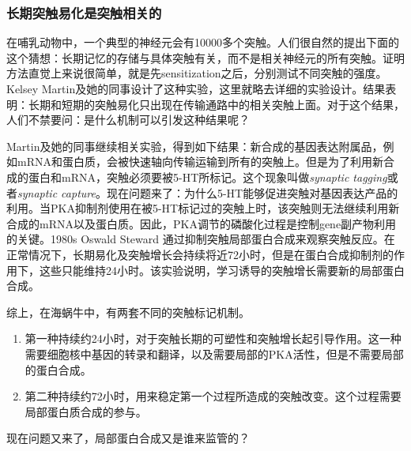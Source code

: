 \documentclass[UTF8,nofonts]{ctexart}
\begin{document}
\subsubsection{长期突触易化是突触相关的}
在哺乳动物中，一个典型的神经元会有10000多个突触。人们很自然的提出下面的这个猜想：长期记忆的存储与具体突触有关，而不是相关神经元的所有突触。证明方法直觉上来说很简单，就是先sensitization之后，分别测试不同突触的强度。Kelsey Martin及她的同事设计了这种实验，这里就略去详细的实验设计。结果表明：长期和短期的突触易化只出现在传输通路中的相关突触上面。对于这个结果，人们不禁要问：是什么机制可以引发这种结果呢？
\par
Martin及她的同事继续相关实验，得到如下结果：新合成的基因表达附属品，例如mRNA和蛋白质，会被快速轴向传输运输到所有的突触上。但是为了利用新合成的蛋白和mRNA，突触必须要被5-HT所标记。这个现象叫做\textit{synaptic tagging}或者\textit{synaptic capture}。现在问题来了：为什么5-HT能够促进突触对基因表达产品的利用。当PKA抑制剂使用在被5-HT标记过的突触上时，该突触则无法继续利用新合成的mRNA以及蛋白质。因此，PKA调节的磷酸化过程是控制gene副产物利用的关键。1980s Oswald Steward 通过抑制突触局部蛋白合成来观察突触反应。在正常情况下，长期易化及突触增长会持续将近72小时，但是在蛋白合成抑制剂的作用下，这些只能维持24小时。该实验说明，学习诱导的突触增长需要新的局部蛋白合成。
\par
综上，在海蜗牛中，有两套不同的突触标记机制。
\begin{enumerate}
\item 第一种持续约24小时，对于突触长期的可塑性和突触增长起引导作用。这一种需要细胞核中基因的转录和翻译，以及需要局部的PKA活性，但是不需要局部的蛋白合成。
\item 第二种持续约72小时，用来稳定第一个过程所造成的突触改变。这个过程需要局部蛋白质合成的参与。
\end{enumerate}
现在问题又来了，局部蛋白合成又是谁来监管的？
\par
\end{document}
